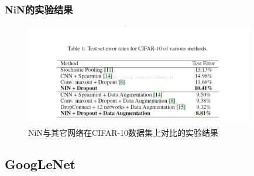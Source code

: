         \subsubsection{NiN的实验结果}
             \begin{figure}[H]
            \centering
            \includegraphics[width=10cm]{images/the_experimental_result_of_NiN_comparewith_other_networks_on_CIFAR-10_dataset.jpg}
            \caption{NiN与其它网络在CIFAR-10数据集上对比的实验结果
            }
            \end{figure}


    \subsection{GoogLeNet}
